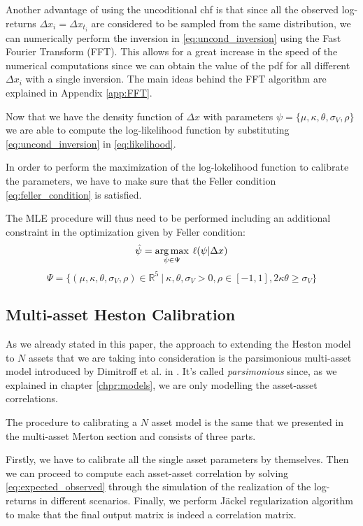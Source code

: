 Another advantage of using the uncoditional chf is that since all the observed log-returns $\Delta x_i = \Delta x_{t_i} $ are considered to be sampled from the same distribution, we can numerically perform the inversion in \eqref{eq:uncond_inversion} using the Fast Fourier Transform (FFT). This allows for a great increase in the speed of the numerical computations since we can obtain the value of the pdf for all different $\Delta x_i$ with a single inversion.
The main ideas behind the FFT algorithm are explained in Appendix \ref{app:FFT}.


Now that we have the density function of $\Delta x$ with parameters $\psi = \{\mu, \kappa, \theta, \sigma_V, \rho \}$ we are able to compute the log-likelihood function by substituting \eqref{eq:uncond_inversion} in \eqref{eq:likelihood}.


In order to perform the maximization of the log-lokelihood function to calibrate the parameters, we have to make sure that the Feller condition \eqref{eq:feller_condition} is satisfied.

The MLE procedure will thus need to be performed including an additional constraint in the optimization given by Feller condition:
\begin{equation}
\hat{\psi} = \operatorname*{arg\,max}_{\psi \in \Psi} \:\ell(\psi |  \Delta x)
\end{equation}
\begin{equation}
	\Psi = \{ (\mu, \kappa, \theta, \sigma_V, \rho) \in \mathbb{R}^5 \: |\: \kappa,\theta,\sigma_V >0, \rho \in [-1,1], 2\kappa\theta \geq \sigma_V \}
\end{equation}

\subsection{Multi-asset Heston Calibration}

As we already stated in this paper, the approach to extending the Heston model to $N$ assets that we are taking into consideration is the parsimonious multi-asset model introduced by Dimitroff et al. in \cite{PARSIMONIOUS2011}.
It's called \textit{parsimonious} since, as we explained in chapter \ref{chpr:models}, we are only modelling the asset-asset correlations.

The procedure to calibrating a $N$ asset model is the same that we presented in the multi-asset Merton section and consists of three parts.

Firstly, we have to calibrate all the single asset parameters by themselves. Then we can proceed to compute each asset-asset correlation by solving \eqref{eq:expected_observed} through the simulation of the realization of the log-returns in different scenarios.
Finally, we perform J\"ackel regularization algorithm to make that the final output matrix is indeed a correlation matrix.

